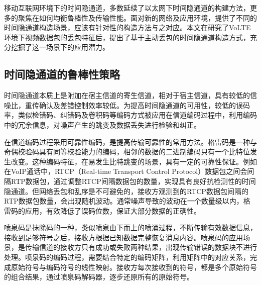 移动互联网环境下的时间隐通道，多数延续了以太网下时间隐通道的构建方法，更多的聚焦在如何均衡鲁棒性及传输性能。面对新的网络及应用环境，提供了不同的时间隐通道构造场景，应该有针对性的构造方法与之对应。本文在研究了VoLTE环境下视频数据包的丢包特征后，提出了基于主动丢包的时间隐通道构造方式，充分挖掘了这一场景下的应用潜力。

\subsection{时间隐通道的鲁棒性策略}
\label{sec:intro:background:robustness}

时间隐通道本质上是附加在宿主信道的寄生信道，相对于宿主信道，具有较低的信噪比，重传确认及差错控制效率较低。为提高时间隐通道的可用性，较低的误码率，类似检错码、纠错码及卷积码等编码方式被应用在信道编码过程中，利用编码中的冗余信息，对噪声产生的跳变及数据丢失进行检验和纠正。

在信道编码过程采用可靠性编码，是提高传输可靠性的常用方法。格雷码是一种与奇偶校验码具有同等校验能力的编码，相邻的数据的二进制编码只有一个比特位发生改变。这种编码特征，在易发生比特跳变的场景，具有一定的可靠性保证。例如在VoIP通话中，RTCP（Real-time Transport Control Protocol）数据包之间会间隔RTP数据包，通过调整RTCP间隔数据包的数量，实现具有良好抗检测性的时间隐通道。但网络丢包和乱序是不可避免的，接收方观测到的RTCP数据包间隔的RTP数据包数量，会出现随机波动。通常噪声导致的波动在一个数量级以内，格雷码的应用，有效降低了误码位数，保证大部分数据的正确性。

喷泉码是抹除码的一种，类似喷泉由下而上的喷涌过程，不断传输有效数据信息，接收到足够符号之后，接收方根据已知数据完整恢复消息内容。喷泉码的应用场景，是传输信道的接收方只有成功或失败两种结果，出现传输错误的数据块不进行处理。喷泉码的编码过程，需要结合特定的编码矩阵，利用矩阵中的对应关系，完成原始符号与编码符号的线性映射。接收方每次接收到的符号，都是多个原始符号的组合结果，通过喷泉码解码器，逐步还原所有的原始符号。


